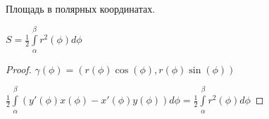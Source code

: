     \begin{conseq}

        Площадь в полярных координатах.

        $S = \frac{1}{2}\int\limits_\alpha^\beta r^2(\phi) d\phi$

        
        \begin{proof}

            $\gamma(\phi) = (r(\phi)\cos(\phi), r(\phi)\sin(\phi))$

            $\frac{1}{2} \int\limits_\alpha^\beta (y'(\phi)x(\phi) - x'(\phi)y(\phi)) d\phi = \frac{1}{2} \int\limits_\alpha^\beta r^2(\phi) d\phi$

        \end{proof}

    \end{conseq}
